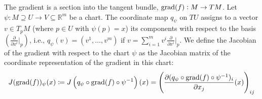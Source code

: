 \begin{definition}
	The gradient is a section into the tangent bundle, $\mathrm{grad}(f):M\to TM$.
	Let $\psi: M\supseteq U\to V \subseteq \mathbb{R}^m$ be a chart. The coordinate map $q_{\psi}$ on $TU$ assigns to a vector $v \in T_pM$ (where $p \in U$ with $\psi(p) = x$) its components with respect to the basis $\left(\frac{\partial}{\partial x^i}\big|_p\right)$, i.e., $q_{\psi}(v) = (v^1, \ldots, v^m)$ if $v = \sum_{i=1}^m v^i \frac{\partial}{\partial x^i}\big|_p$.
	We define the Jacobian of the gradient with respect to the chart $\psi$ as the Jacobian matrix of the coordinate representation of the gradient in this chart:
	\[
	J(\mathrm{grad}(f))_\psi(x) \coloneq J\left(q_{\psi}\circ \mathrm{grad}(f)\circ \psi^{-1}\right)(x) = \left(\frac{\partial (q_{\psi}\circ \mathrm{grad}(f)\circ \psi^{-1})_i}{\partial x_j}(x)\right)_{ij}
	\]
\end{definition}


